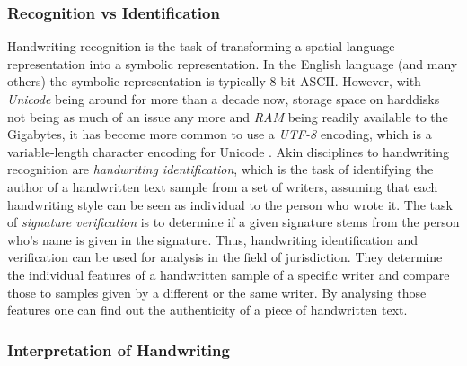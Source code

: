 \subsubsection{Recognition vs Identification}
\label{sec:recognitionvsidentification}

Handwriting recognition is the task of transforming a spatial language 
representation into a symbolic representation. In the English language
(and many others) the symbolic representation is typically 8-bit ASCII.
However, with \emph{Unicode} being around for more than a decade now,
storage space on harddisks not being as much of an issue any more and
\emph{RAM} being readily available to the Gigabytes, it has become more 
common to use a \emph{UTF-8}  encoding, which is a variable-length character 
encoding for Unicode .
Akin disciplines to handwriting recognition are 
\emph{handwriting identification}, which is the task of identifying the author
of a handwritten text sample from a set of writers, assuming that each
handwriting style can be seen as individual to the person who wrote it.
The task of \emph{signature verification} is to determine if a given signature
stems from the person who's name is given in the signature.
Thus, handwriting identification and verification can be used for 
analysis in the field of jurisdiction. They determine the individual features
of a handwritten sample of a specific writer and compare those
to samples given by a different or the same writer. By analysing those 
features one can find out the authenticity of a piece of handwritten text.

\subsubsection{Interpretation of Handwriting}
\label{sec:interpretationofhandwriting}

